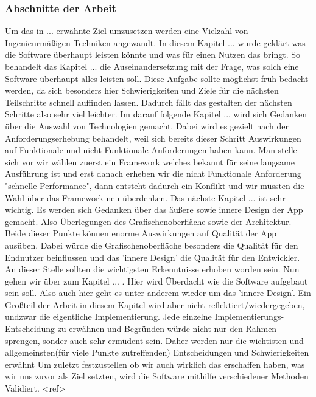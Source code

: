 \subsubsection{Abschnitte der Arbeit}
Um das in ... erwähnte Ziel umzusetzen werden eine Vielzahl von Ingenieurmäßigen-Techniken angewandt. \newline
In diesem Kapitel ... wurde geklärt was die Software überhaupt leisten könnte und was für einen Nutzen das bringt. \newline
So behandelt das Kapitel ... die Auseinandersetzung mit der Frage, was solch eine Software überhaupt alles leisten soll. Diese Aufgabe sollte möglichst früh bedacht werden, da sich besonders hier Schwierigkeiten und Ziele für die nächsten Teilschritte schnell auffinden lassen. Dadurch fällt das gestalten der nächsten Schritte also sehr viel leichter. \newline
Im darauf folgende Kapitel ... wird sich Gedanken über die Auswahl von Technologien gemacht. Dabei wird es gezielt nach der Anforderungserhebung behandelt, weil sich bereits dieser Schritt Auswirkungen auf Funktionale und nicht Funktionale Anforderungen haben kann. Man stelle sich vor wir wählen zuerst ein Framework welches bekannt für seine langsame Ausführung ist und erst danach erheben wir die nicht Funktionale Anforderung "schnelle Performance", dann entsteht dadurch ein Konflikt und wir müssten die Wahl über das Framework neu überdenken. \newline
Das nächste Kapitel ... ist sehr wichtig. Es werden sich Gedanken über das äußere sowie innere Design der App gemacht. Also Überlegungen des Grafischenoberfläche sowie der Architektur. Beide dieser Punkte können enorme Auswirkungen auf Qualität der App ausüben. Dabei würde die Grafischenoberfläche besonders die Qualität für den Endnutzer beinflussen und das 'innere Design' die Qualität für den Entwickler.\newline
 An dieser Stelle sollten die wichtigsten Erkenntnisse erhoben worden sein. Nun gehen wir über zum Kapitel ... . Hier wird Überdacht wie die Software aufgebaut sein soll. Also auch hier geht es unter anderem wieder um das 'innere Design'. Ein Großteil der Arbeit in diesem Kapitel wird aber nicht reflektiert/wiedergegeben, undzwar die eigentliche Implementierung. Jede einzelne Implementierungs-Entscheidung zu erwähnen und Begründen würde nicht nur den Rahmen sprengen, sonder auch sehr ermüdent sein. Daher werden nur die wichtisten und allgemeinsten(für viele Punkte zutreffenden) Entscheidungen und Schwierigkeiten erwähnt \newline
 Um zuletzt festzustellen ob wir auch wirklich das erschaffen haben, was wir uns zuvor als Ziel setzten, wird die Software mithilfe verschiedener Methoden Validiert. <ref>